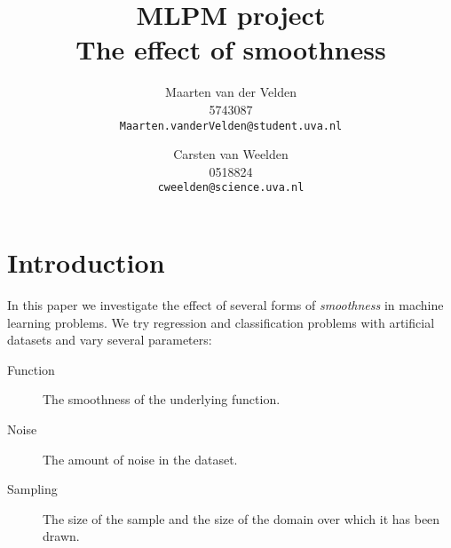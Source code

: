 \documentclass[a4paper]{article}
\begin{document}
\title{MLPM project \\ The effect of smoothness}
\author{Maarten van der Velden \\ 5743087 \\ \texttt{Maarten.vanderVelden@student.uva.nl} \and Carsten van Weelden \\ 0518824 \\ \texttt{cweelden@science.uva.nl}}
\maketitle


\acresetall

\section{Introduction}
\label{sec:introduction}

In this paper we investigate the effect of several forms of \emph{smoothness} in machine learning problems. We try regression and classification problems with artificial datasets and vary several parameters:
\begin{description}
\item[Function] The smoothness of the underlying function.
\item[Noise] The amount of noise in the dataset.
\item[Sampling] The size of the sample and the size of the domain over which it has been drawn.
\end{description}
\end{document}
